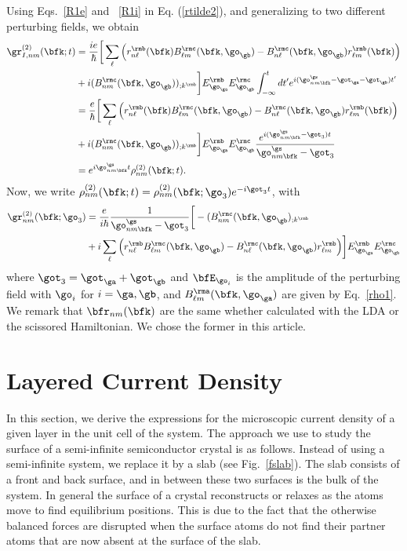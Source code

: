 \documentclass[floatfix,prb,aps,superscriptaddress,11pt,preprint,letterpaper]{revtex4}
\begin{document}
Using Eqs.~\eqref{R1e} and ~\eqref{R1i} in Eq. (\ref{rtilde2}),
and generalizing to two different perturbing fields,
we obtain
\begin{align}\label{rtilde33}
\gr^{(2)}_{I,nm}(\bfk;t)
&=
\frac{ie}{\hbar}
\bigg[
\sum_{\ell}
\Big(
r^{\rmb}_{n\ell}(\bfk)
B^{\rmc}_{\ell m}(\bfk,\go_\gb)
-
B^{\rmc}_{n\ell}(\bfk,\go_\gb)
r^{\rmb}_{\ell m}(\bfk)
\Big)
\nonumber \\
&+
i
(B^{\rmc}_{nm}(\bfk,\go_\gb))_{;k^{\rmb}}
\bigg]
E^{\rmb}_{\go_\ga}E_{\go_\gb}^{\rmc}
\int_{-\infty}^t dt'
e^{i(\go^\gs_{nm\bfk}-\got_\ga-\got_\gb)t'}
\nonumber \\
&=
\frac{e}{\hbar}
\bigg[
\sum_{\ell}
\Big(
r^{\rmb}_{n\ell}(\bfk)
B^{\rmc}_{\ell m}(\bfk,\go_\gb)
-
B^{\rmc}_{n\ell}(\bfk,\go_\gb)
r^{\rmb}_{\ell m}(\bfk)
\Big)
\nonumber \\
&+
i
(B^{\rmc}_{nm}(\bfk,\go_\gb))_{;k^{\rmb}}
\bigg]
E^{\rmb}_{\go_\ga}E_{\go_\gb}^{\rmc}
\frac{e^{i(\go^\gs_{nm\bfk}-\got_3)t}}
{\go^\gs_{nm\bfk}-\got_3}
\nonumber \\
&=
e^{i\go^\gs_{nm\bfk}t}
\rho_{nm}^{(2)}(\bfk;t)
.
\end{align}
Now, we write
$\rho_{nm}^{(2)}(\bfk;t)=\rho_{nm}^{(2)}(\bfk;\go_3)e^{-i\got_3 t}$,
with
\begin{align}\label{rho2}
\gr_{nm}^{(2)}(\bfk;\go_3)&=\frac{e}{i\hbar}\frac{1}{\go^\gs_{nm\bfk}-\got_3}
\bigg[-(B_{nm}^{\rmc}(\bfk,\go_\gb)_{;k^{\rmb}}
\nonumber \\
&
+i\sum_\ell\Big(r_{n\ell}^{\rmb}B_{\ell m}^{\rmc}(\bfk,\go_\gb) - B_{n\ell}^{\rmc}(\bfk,\go_\gb)
  r_{\ell m}^{\rmb}\Big)
\bigg] 
E^{\rmb}_{\go_\ga}E_{\go_\gb}^{\rmc}
\end{align} 
where $\got_3=\got_\ga+\got_\gb$ and $\bfE_{\go_i}$ is the amplitude of the 
perturbing field with $\go_i$ for $i=\ga,\gb$, and 
$B_{\ell m}^{\rma}(\bfk,\go_\ga)$ are given by Eq.~\eqref{rho1}. 
We remark that $\bfr_{nm}(\bfk)$  are
the same whether calculated with the LDA or the scissored Hamiltonian. 
We chose the former in this article.

\section{Layered Current Density}\label{cd}

In this section, we derive the expressions for the microscopic current
density of a given layer in the unit cell of the system.
The approach we use to study the surface of a semi-infinite
semiconductor crystal is as follows. Instead of using a
semi-infinite system, we replace it by a slab (see Fig.~\ref{fslab}).
The slab consists of a front and back surface, and in between these
two surfaces is the bulk of the system. 
In general the surface of a crystal reconstructs or relaxes as the atoms
move to find equilibrium positions. This is due to the fact that
the otherwise
balanced forces are disrupted when the surface atoms do not find their 
partner atoms that are now absent at the surface of the slab. 
\end{document}
